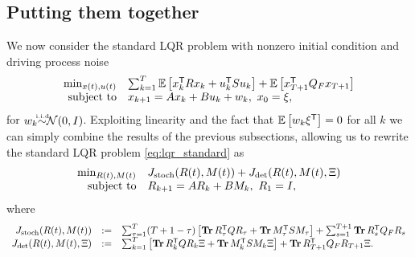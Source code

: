 \documentclass[11pt]{article}
\numberwithin{equation}{section}
\begin{document}
\subsection{Putting them together}
We now consider the standard LQR problem with nonzero initial condition and driving process noise
\begin{equation}
\begin{array}{rl}
\min_{x(t),u(t)} & \sum_{k=1}^T \mathbb{E}\left[x_k^{\mathsf{T}} R x_k + u_k^{\mathsf{T}} Su_k\right]+ \mathbb{E}\left[x_{T+1}^{\mathsf{T}} Q_F x_{T+1}\right]\\
\mbox{subject to} & x_{k+1} = Ax_k + Bu_k + w_k, \ x_0 = \xi,
\end{array}
\label{eq:lqr_standard}
\end{equation}
for $w_k {\iid}\mathcal{N}(0,I)$.  Exploiting linearity and the fact that $\mathbb{E}\left[ w_k\xi^{\mathsf{T}}\right] = 0$ for all $k$ we can simply combine the results of the previous subsections, allowing us to rewrite the standard LQR problem \eqref{eq:lqr_standard} as
\begin{equation}
\begin{array}{rl}
\min_{R(t),M(t)} & J_\mathrm{stoch}(R(t),M(t)) + J_\mathrm{det}(R(t),M(t),\Xi) \\
\mbox{subject to} & R_{k+1} = AR_k + BM_k, \ R_1 = I,
\end{array}
\label{eq:sls_LQR}
\end{equation}
where 
\begin{equation}
\begin{array}{rcl}
J_\mathrm{stoch}(R(t),M(t)) &:=& \sum_{\tau=1}^T (T+1-\tau)\left[\operatorname*{\mathbf{Tr}} R_\tau^{\mathsf{T}} Q R_\tau + \operatorname*{\mathbf{Tr}} M_\tau^{\mathsf{T}} S M_\tau\right] + \sum_{s=1}^{T+1} \operatorname*{\mathbf{Tr}} R_s^{\mathsf{T}} Q_F R_s \\
J_\mathrm{det}(R(t),M(t),\Xi) &:=& \sum_{k=1}^T\left[\operatorname*{\mathbf{Tr}} R_k^{\mathsf{T}} Q R_k\Xi + \operatorname*{\mathbf{Tr}} M_k^{\mathsf{T}} S M_k\Xi\right] +  \operatorname*{\mathbf{Tr}} R_{T+1}^{\mathsf{T}} Q_F R_{T+1}\Xi.
\end{array}
\end{equation}
\end{document}
